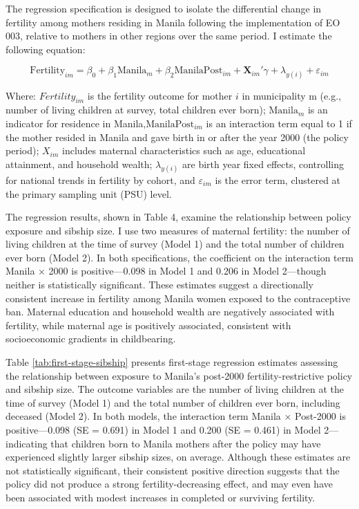 \documentclass[]{AEA}
\begin{document}
The regression specification is designed to isolate the differential
change in fertility among mothers residing in Manila following the
implementation of EO 003, relative to mothers in other regions over the
same period. I estimate the following equation:

\[
\text{Fertility}_{im} = \beta_0 + \beta_1 \text{Manila}_m + \beta_2 \text{ManilaPost}_{im} + \boldsymbol{X}_{im}'\gamma + \lambda_{y(i)} + \varepsilon_{im}
\]

Where: \(Fertility_{im}\) is the fertility outcome for mother \(i\) in
municipality m (e.g., number of living children at survey, total
children ever born); \(\text{Manila}_m\) is an indicator for residence
in Manila,\(\text{ManilaPost}_{im}\) is an interaction term equal to 1
if the mother resided in Manila and gave birth in or after the year 2000
(the policy period); \(X_{im}\) includes maternal characteristics such
as age, educational attainment, and household wealth; \(\lambda_{y(i)}\)
are birth year fixed effects, controlling for national trends in
fertility by cohort, and \(\varepsilon_{im}\) is the error term,
clustered at the primary sampling unit (PSU) level.

The regression results, shown in Table 4, examine the relationship
between policy exposure and sibship size. I use two measures of maternal
fertility: the number of living children at the time of survey (Model 1)
and the total number of children ever born (Model 2). In both
specifications, the coefficient on the interaction term Manila × 2000 is
positive---0.098 in Model 1 and 0.206 in Model 2---though neither is
statistically significant. These estimates suggest a directionally
consistent increase in fertility among Manila women exposed to the
contraceptive ban. Maternal education and household wealth are
negatively associated with fertility, while maternal age is positively
associated, consistent with socioeconomic gradients in childbearing.

Table \ref{tab:first-stage-sibship} presents first-stage regression
estimates assessing the relationship between exposure to Manila's
post-2000 fertility-restrictive policy and sibship size. The outcome
variables are the number of living children at the time of survey (Model
1) and the total number of children ever born, including deceased (Model
2). In both models, the interaction term Manila × Post-2000 is
positive---0.098 (SE = 0.691) in Model 1 and 0.200 (SE = 0.461) in Model
2---indicating that children born to Manila mothers after the policy may
have experienced slightly larger sibship sizes, on average. Although
these estimates are not statistically significant, their consistent
positive direction suggests that the policy did not produce a strong
fertility-decreasing effect, and may even have been associated with
modest increases in completed or surviving fertility.
\end{document}
